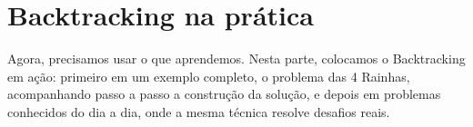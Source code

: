 \part{Backtracking na prática}

Agora, precisamos usar o que aprendemos. Nesta parte, colocamos o Backtracking em ação: primeiro em um exemplo completo, o problema das 4 Rainhas, acompanhando passo a passo a construção da solução, e depois em problemas conhecidos do dia a dia, onde a mesma técnica resolve desafios reais.
